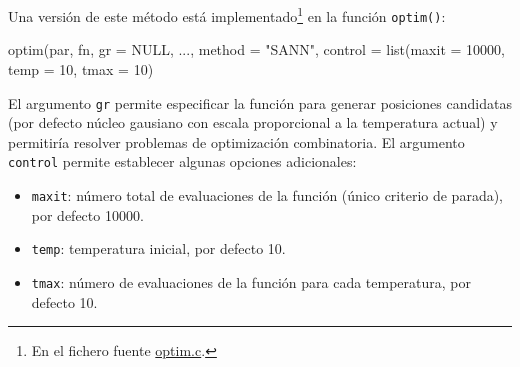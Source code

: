 \documentclass[
  10pt,
]{book}
\newenvironment{Shaded}{\begin{snugshade}}{\end{snugshade}}
\newcommand{\AttributeTok}[1]{\textcolor[rgb]{0.77,0.63,0.00}{#1}}
\newcommand{\ConstantTok}[1]{\textcolor[rgb]{0.00,0.00,0.00}{#1}}
\newcommand{\DecValTok}[1]{\textcolor[rgb]{0.00,0.00,0.81}{#1}}
\newcommand{\FunctionTok}[1]{\textcolor[rgb]{0.00,0.00,0.00}{#1}}
\newcommand{\NormalTok}[1]{#1}
\newcommand{\StringTok}[1]{\textcolor[rgb]{0.31,0.60,0.02}{#1}}
\theoremstyle{break}
\theoremstyle{nonumberplain}
\let\oldfootnote\footnote
\renewcommand\footnote[1]{\oldfootnote{\hspace{2mm}#1}}
\begin{document}
Una versión de este método está implementado\footnote{En el fichero fuente \href{https://svn.r-project.org/R/trunk/src/appl/optim.c}{optim.c}.} en la función \texttt{optim()}:

\begin{Shaded}
\begin{Highlighting}[]
\FunctionTok{optim}\NormalTok{(par, fn, }\AttributeTok{gr =} \ConstantTok{NULL}\NormalTok{, ..., }\AttributeTok{method =} \StringTok{"SANN"}\NormalTok{, }\AttributeTok{control =} \FunctionTok{list}\NormalTok{(}\AttributeTok{maxit =} \DecValTok{10000}\NormalTok{, }\AttributeTok{temp =} \DecValTok{10}\NormalTok{, }\AttributeTok{tmax =} \DecValTok{10}\NormalTok{)}
\end{Highlighting}
\end{Shaded}

El argumento \texttt{gr} permite especificar la función para generar posiciones candidatas (por defecto núcleo gausiano con escala proporcional a la temperatura actual) y permitiría resolver problemas de optimización combinatoria.
El argumento \texttt{control} permite establecer algunas opciones adicionales:

\begin{itemize}
\item
  \texttt{maxit}: número total de evaluaciones de la función (único criterio de parada), por defecto 10000.
\item
  \texttt{temp}: temperatura inicial, por defecto 10.
\item
  \texttt{tmax}: número de evaluaciones de la función para cada temperatura, por defecto 10.
\end{itemize}
\end{document}
